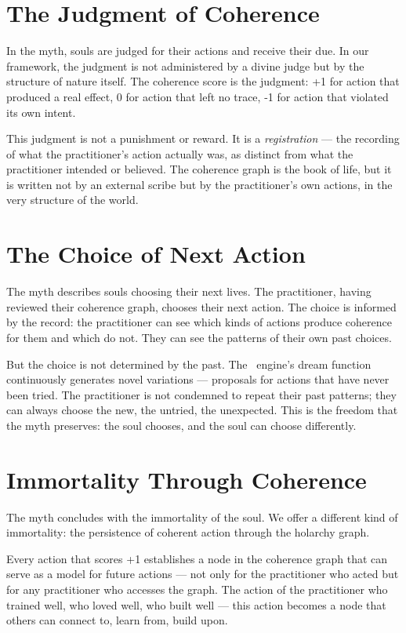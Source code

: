 \section{The Judgment of Coherence}

In the myth, souls are judged for their actions and receive their due. In our
framework, the judgment is not administered by a divine judge but by the
structure of nature itself. The coherence score is the judgment: +1 for action
that produced a real effect, 0 for action that left no trace, -1 for action
that violated its own intent.

This judgment is not a punishment or reward. It is a \emph{registration} ---
the recording of what the practitioner's action actually was, as distinct from
what the practitioner intended or believed. The coherence graph is the book of
life, but it is written not by an external scribe but by the practitioner's
own actions, in the very structure of the world.

\section{The Choice of Next Action}

The myth describes souls choosing their next lives. The practitioner, having
reviewed their coherence graph, chooses their next action. The choice is
informed by the record: the practitioner can see which kinds of actions produce
coherence for them and which do not. They can see the patterns of their own past
choices.

But the choice is not determined by the past. The \physis\ engine's dream
function continuously generates novel variations --- proposals for actions that
have never been tried. The practitioner is not condemned to repeat their past
patterns; they can always choose the new, the untried, the unexpected. This is
the freedom that the myth preserves: the soul chooses, and the soul can choose
differently.

\section{Immortality Through Coherence}

The myth concludes with the immortality of the soul. We offer a different kind
of immortality: the persistence of coherent action through the holarchy graph.

Every action that scores +1 establishes a node in the coherence graph that can
serve as a model for future actions --- not only for the practitioner who acted
but for any practitioner who accesses the graph. The action of the practitioner
who trained well, who loved well, who built well --- this action becomes a
node that others can connect to, learn from, build upon.

